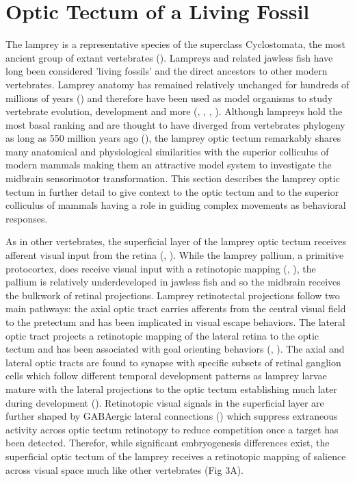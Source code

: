 \documentclass{ar-1col}
\begin{document}
\section{Optic Tectum of a Living Fossil}
The lamprey is a representative species of the superclass Cyclostomata, the most ancient group of extant vertebrates (\cite{yang2016lamprey}). Lampreys and related jawless fish have long been considered 'living fossils' and the direct ancestors to other modern vertebrates. Lamprey anatomy has remained relatively unchanged for hundreds of millions of years (\cite{gess2006lamprey}) and therefore have been used as model organisms to study vertebrate evolution, development and more (\cite{nikitina2009sea}, \cite{green2014lamprey}, \cite{mccauley2015lampreys}, \cite{yang2016lamprey}). Although lampreys hold the most basal ranking and are thought to have diverged from vertebrates phylogeny as long as 550 million years ago (\cite{kumar1998molecular}), the lamprey optic tectum remarkably shares many anatomical and physiological similarities with the superior colliculus of modern mammals making them an attractive model system to investigate the midbrain sensorimotor transformation. This section describes the lamprey optic tectum in further detail to give context to the optic tectum and to the superior colliculus of mammals having a role in guiding complex movements as behavioral responses.

As in other vertebrates, the superficial layer of the lamprey optic tectum receives afferent visual input from the retina (\cite{kosareva1980retinal}, \cite{kennedy1977retinal}). While the lamprey pallium, a primitive protocortex, does receive visual input with a retinotopic mapping (\cite{suryanarayana2017lamprey}, \cite{suryanarayana2020evolutionary}), the pallium is relatively underdeveloped in jawless fish and so the midbrain receives the bulkwork of retinal projections. Lamprey retinotectal projections follow two main pathways: the axial optic tract carries afferents from the central visual field to the pretectum and has been implicated in visual escape behaviors. The lateral optic tract projects a retinotopic mapping of the lateral retina to the optic tectum and has been associated with goal orienting behaviors (\cite{jones2009selective}, \cite{cornide2011retinotopy}). The axial and lateral optic tracts are found to synapse with specific subsets of retinal ganglion cells which follow different temporal development patterns as lamprey larvae mature with the lateral projections to the optic tectum establishing much later during development (\cite{cornide2011retinotopy}). Retinotopic visual signals in the superficial layer are further shaped by GABAergic lateral connections (\cite{kardamakis2015tectal}) which suppress extraneous activity across optic tectum retinotopy to reduce competition once a target has been detected. Therefor, while significant embryogenesis differences exist, the superficial optic tectum of the lamprey receives a retinotopic mapping of salience across visual space much like other vertebrates (Fig 3A).
\end{document}
